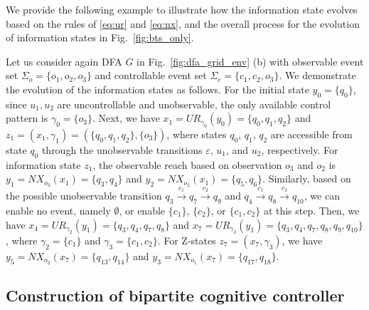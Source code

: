 \documentclass[journal,twoside,web]{ieeecolor}
\begin{document}
We provide the following example to illustrate how the information state evolves based on the rules of \eqref{eq:ur} and \eqref{eq:nx}, and the overall process for the evolution of information states in Fig.~\ref{fig:bts_only}.
%
\begin{example}\label{ex:is_update}
    Let us consider again DFA $G$ in Fig.~\ref{fig:dfa_grid_env} (b) with observable event set $\Sigma_o = \{o_1, o_2, o_3\}$ and controllable event set $\Sigma_c = \{ c_1, c_2, o_3 \}$. 
    We demonstrate the evolution of the information states as follows.
    For the initial state $y_0 = \{ q_0 \}$, since $u_1, u_2$ are uncontrollable and unobservable, the only available control pattern is $\gamma_0 = \{ o_3 \}$.
    Next, we have $x_1 = UR_{\gamma_0}(y_0) = \{ q_0, q_1, q_2 \}$ and $z_1 = (x_1, \gamma_1) = (\{ q_0, q_1, q_2 \}, \{ o_3 \})$, where states $q_0$, $q_1$, $q_2$ are accessible from state $q_0$ through the unobservable transitions $\varepsilon$, $u_1$, and $u_2$, respectively.
    For information state $z_1$, the observable reach based on observation $o_3$ and $o_2$ is
    $y_1 = NX_{o_3}(x_1) = \{ q_3, q_4 \}$ and $y_2 = NX_{o_2}(x_1) = \{ q_5, q_6 \}$.
    Similarly, based on the possible unobservable transition $q_3 \xrightarrow{c_1} q_7 \xrightarrow{c_2} q_9$ and $q_4 \xrightarrow{c_1} q_8 \xrightarrow{c_2} q_{10}$, we can enable no event, namely $\emptyset$, or enable $\{ c_1 \}$, $\{ c_2 \}$, or $\{ c_1,c_2 \}$ at this step.
    Then, we have
    $x_4 = UR_{\gamma_2}(y_1) = \{ q_3, q_4, q_7, q_8 \}$ and
    $x_7 = UR_{\gamma_3}(y_1) = \{ q_3, q_4, q_7, q_8, q_9, q_{10} \}$,
    where $\gamma_2 = \{ c_1 \}$ and $\gamma_3 = \{ c_1, c_2 \}$.
    For Z-states $z_7 = (x_7, \gamma_3)$, we have
    $y_5 = NX_{o_2}(x_7) = \{ q_{13}, q_{14} \}$ and
    $y_3 = NX_{o_1}(x_7) = \{ q_{17}, q_{18} \}$.
\end{example}

\subsection{Construction of bipartite cognitive controller}
\end{document}
